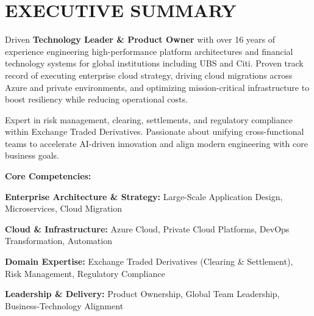 \section{EXECUTIVE SUMMARY}
Driven \textbf{Technology Leader \& Product Owner} with over 16 years of experience engineering high-performance platform architectures and financial technology systems for global institutions including UBS and Citi. Proven track record of executing enterprise cloud strategy, driving cloud migrations across Azure and private environments, and optimizing mission-critical infrastructure to boost resiliency while reducing operational costs.

\vspace{4pt}
Expert in risk management, clearing, settlements, and regulatory compliance within Exchange Traded Derivatives. Passionate about unifying cross-functional teams to accelerate AI-driven innovation and align modern engineering with core business goals.

\vspace{6pt}
\textbf{Core Competencies:}
\begin{itemize}[leftmargin=0.15in, label={$\bullet$}]
  \small{
    \item \textbf{Enterprise Architecture \& Strategy:} Large-Scale Application Design, Microservices, Cloud Migration
    \item \textbf{Cloud \& Infrastructure:} Azure Cloud, Private Cloud Platforms, DevOps Transformation, Automation
    \item \textbf{Domain Expertise:} Exchange Traded Derivatives (Clearing \& Settlement), Risk Management, Regulatory Compliance
    \item \textbf{Leadership \& Delivery:} Product Ownership, Global Team Leadership, Business-Technology Alignment
  }
\end{itemize}